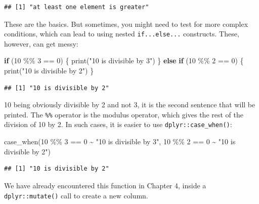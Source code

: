\documentclass[
]{article}
\newenvironment{Shaded}{\begin{snugshade}}{\end{snugshade}}
\newcommand{\ControlFlowTok}[1]{\textcolor[rgb]{0.13,0.29,0.53}{\textbf{#1}}}
\newcommand{\DecValTok}[1]{\textcolor[rgb]{0.00,0.00,0.81}{#1}}
\newcommand{\FunctionTok}[1]{\textcolor[rgb]{0.00,0.00,0.00}{#1}}
\newcommand{\NormalTok}[1]{#1}
\newcommand{\SpecialCharTok}[1]{\textcolor[rgb]{0.00,0.00,0.00}{#1}}
\newcommand{\StringTok}[1]{\textcolor[rgb]{0.31,0.60,0.02}{#1}}
\begin{document}
\begin{verbatim}
## [1] "at least one element is greater"
\end{verbatim}

These are the basics. But sometimes, you might need to test for more complex conditions, which can
lead to using nested \texttt{if...else...} constructs. These, however, can get messy:

\begin{Shaded}
\begin{Highlighting}[]
\ControlFlowTok{if}\NormalTok{ (}\DecValTok{10} \SpecialCharTok{\%\%} \DecValTok{3} \SpecialCharTok{==} \DecValTok{0}\NormalTok{) \{}
  \FunctionTok{print}\NormalTok{(}\StringTok{"10 is divisible by 3"}\NormalTok{)}
\NormalTok{  \} }\ControlFlowTok{else} \ControlFlowTok{if}\NormalTok{ (}\DecValTok{10} \SpecialCharTok{\%\%} \DecValTok{2} \SpecialCharTok{==} \DecValTok{0}\NormalTok{) \{}
    \FunctionTok{print}\NormalTok{(}\StringTok{"10 is divisible by 2"}\NormalTok{)}
\NormalTok{\}}
\end{Highlighting}
\end{Shaded}

\begin{verbatim}
## [1] "10 is divisible by 2"
\end{verbatim}

10 being obviously divisible by 2 and not 3, it is the second sentence that will be printed. The
\texttt{\%\%} operator is the modulus operator, which gives the rest of the division of 10 by 2. In such
cases, it is easier to use \texttt{dplyr::case\_when()}:

\begin{Shaded}
\begin{Highlighting}[]
\FunctionTok{case\_when}\NormalTok{(}\DecValTok{10} \SpecialCharTok{\%\%} \DecValTok{3} \SpecialCharTok{==} \DecValTok{0} \SpecialCharTok{\textasciitilde{}} \StringTok{"10 is divisible by 3"}\NormalTok{,}
          \DecValTok{10} \SpecialCharTok{\%\%} \DecValTok{2} \SpecialCharTok{==} \DecValTok{0} \SpecialCharTok{\textasciitilde{}} \StringTok{"10 is divisible by 2"}\NormalTok{)}
\end{Highlighting}
\end{Shaded}

\begin{verbatim}
## [1] "10 is divisible by 2"
\end{verbatim}

We have already encountered this function in Chapter 4, inside a \texttt{dplyr::mutate()} call to create a new column.
\end{document}
